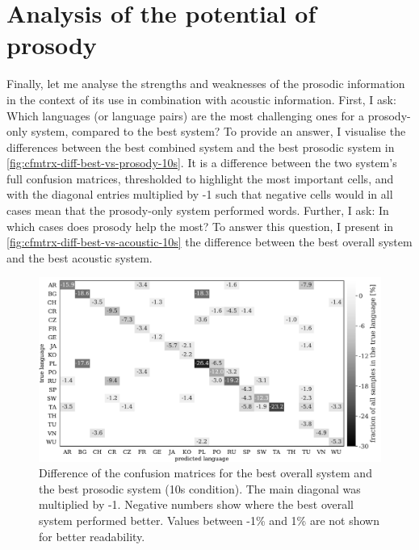 \documentclass[bsc,frontabs,twoside,singlespacing,parskip,deptreport]{infthesis}
\begin{document}
{  \section{Analysis of the potential of prosody}{
    \label{sec:discussion-prosody}
    Finally, let me analyse the strengths and weaknesses of the prosodic information in the context of its use in combination with acoustic information. First, I ask: Which languages (or language pairs) are the most challenging ones for a prosody-only system, compared to the best system? To provide an answer, I visualise the differences between the best combined system and the best prosodic system in \autoref{fig:cfmtrx-diff-best-vs-prosody-10s}. It is a difference between the two system's full confusion matrices, thresholded to highlight the most important cells, and with the diagonal entries multiplied by -1 such that negative cells would in all cases mean that the prosody-only system performed words. Further, I ask: In which cases does prosody help the most? To answer this question, I present in \autoref{fig:cfmtrx-diff-best-vs-acoustic-10s} the difference between the best overall system and the best acoustic system.
    \begin{figure}[h!t]
      \centering
      \includegraphics[width=\textwidth]{../img/diff_best_vs_pitch_energy.pdf}
      \caption{Difference of the confusion matrices for the best overall system and the best prosodic system (10s condition). The main diagonal was multiplied by -1. Negative numbers show where the best overall system performed better. Values between -1\% and 1\% are not shown for better readability.}
      \label{fig:cfmtrx-diff-best-vs-prosody-10s}

\end{figure}}}
\end{document}
